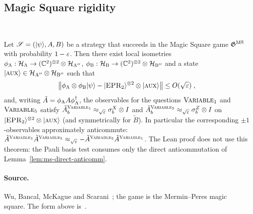 \subsection{Magic Square rigidity}
\label{sec:rr-magic-square}

\effortEasy\ \qlib

\begin{theorem}
\label{thm:ms-rigidity}
Let $\mathscr{S} = (|\psi\rangle, A, B)$ be a strategy that succeeds in the Magic Square
game $\mathfrak{G}^{\mathrm{MS}}$ with probability $1 - \varepsilon$. Then there exist local isometries
$\phi_{\textsc{A}} : \mathcal{H}_{\textsc{A}} \to (\mathbb{C}^2)^{\otimes 2} \otimes \mathcal{H}_{\textsc{A}''}$, $\phi_{\textsc{B}} :
\mathcal{H}_{\textsc{B}} \to (\mathbb{C}^2)^{\otimes 2} \otimes \mathcal{H}_{\textsc{B}''}$ and a state $|\textsc{aux}\rangle \in
\mathcal{H}_{\textsc{A}''} \otimes \mathcal{H}_{\textsc{B}''}$ such that
\begin{equation*}
  \left\| { \phi_{\textsc{A}} \otimes \phi_{\textsc{B}} |\psi\rangle - |\textsc{EPR}_2\rangle^{\otimes 2} \otimes |\textsc{aux}\rangle } \right\|
  \leq O(\sqrt{\varepsilon})\;,
\end{equation*}
and, writing $\tilde A = \phi_{\textsc{A}} A \phi_{\textsc{A}}^\dagger$, the observables for the
questions $\textsc{Variable}_1$ and $\textsc{Variable}_5$ satisfy
$\tilde A^{\textsc{Variable}_1}_b \approx_{\sqrt{\varepsilon}} \sigma^X_b \otimes I$ and
$\tilde A^{\textsc{Variable}_5}_b \approx_{\sqrt{\varepsilon}} \sigma^Z_b \otimes I$ on
$|\textsc{EPR}_2\rangle^{\otimes 2} \otimes |\textsc{aux}\rangle$ (and symmetrically for $\tilde B$). In
particular the corresponding $\pm 1$-observables approximately anticommute:
$\tilde A^{\textsc{Variable}_1} \tilde A^{\textsc{Variable}_5} \approx_{\sqrt{\varepsilon}}
- \tilde A^{\textsc{Variable}_5} \tilde A^{\textsc{Variable}_1}$.
The Lean proof does not use this theorem: the Pauli basis test consumes only the direct
anticommutation of Lemma~\ref{lem:ms-direct-anticomm}.
\end{theorem}

\paragraph{Source.} Wu, Bancal, McKague and Scarani~\cite{WBMS16}; the game is the
Mermin--Peres magic square. The form above is~\cite[Section 8]{JNVWY20}.

\effortMedium

